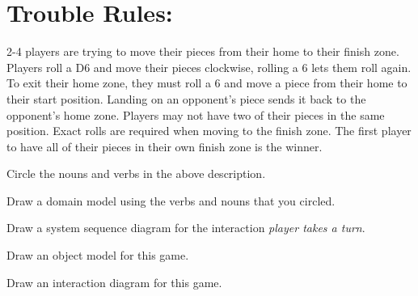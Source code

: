 \documentclass{exam}
\begin{document}

\vspace{10mm}

\section*{Trouble Rules:}

2-4 players are trying to move their pieces from their home to their finish
zone. Players roll a D6 and move their pieces clockwise, rolling a 6 lets them
roll again. To exit their home zone, they must roll a 6 and move a piece from
their home to their start position. Landing on an opponent's piece sends it back
to the opponent's home zone. Players may not have two of their pieces in the
same position. Exact rolls are required when moving to the finish zone. The
first player to have all of their pieces in their own finish zone is the winner.

\begin{questions}
  \question Circle the nouns and verbs in the above description.

  \question Draw a domain model using the verbs and nouns that you circled.

  \question Draw a system sequence diagram for the interaction \emph{player
    takes a turn}.
  \clearpage

  \question Draw an object model for this game.

  \question Draw an interaction diagram for this game.
\end{questions}
\end{document}
